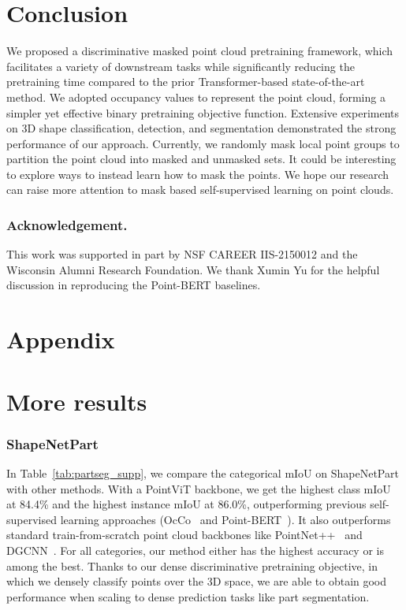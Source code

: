 \documentclass[runningheads]{llncs}
\begin{document}
 \section{Conclusion}
We proposed a discriminative masked point cloud pretraining framework, which  facilitates a variety of downstream tasks while significantly reducing the pretraining time compared to the prior Transformer-based state-of-the-art method. We adopted occupancy values to represent the point cloud, forming a simpler yet effective binary pretraining objective function. Extensive experiments on 3D shape classification, detection, and segmentation demonstrated the strong performance of our approach. Currently, we randomly mask local point groups to partition the point cloud into masked and unmasked sets. It could be interesting to explore ways to instead learn how to mask the points. We hope our research can raise more attention to mask based self-supervised learning on point clouds.  
\vspace{-10pt}
\subsubsection{Acknowledgement.} This work was supported in part by NSF CAREER IIS-2150012 and the Wisconsin Alumni Research Foundation. We thank Xumin Yu for the helpful discussion in reproducing the Point-BERT baselines.
 \appendix

\section*{Appendix}
\section{More results}
\subsubsection{ShapeNetPart}

In Table~\ref{tab:partseg_supp}, we compare the categorical mIoU on ShapeNetPart with other methods.  With a PointViT backbone, we get the highest class mIoU at 84.4\% and the highest instance mIoU at 86.0\%, outperforming previous self-supervised learning approaches (OcCo~\cite{occo} and Point-BERT~\cite{yu2021point}).  It also outperforms standard train-from-scratch point cloud backbones like PointNet++~\cite{qi2017pointnetplusplus} and DGCNN~\cite{wang2019dynamic}. For all categories, our method either has the highest accuracy or is among the best. Thanks to our dense discriminative pretraining objective, in which we densely classify points over the 3D space, we are able to obtain good performance when scaling to dense prediction tasks like part segmentation.
\end{document}
